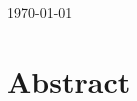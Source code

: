 \documentclass[12pt]{article}
\begin{document}
\begin{titlepage}

{\large \today}\\[3cm] %


 

\vfill %

\end{titlepage}


\section{Abstract}
\end{document}
